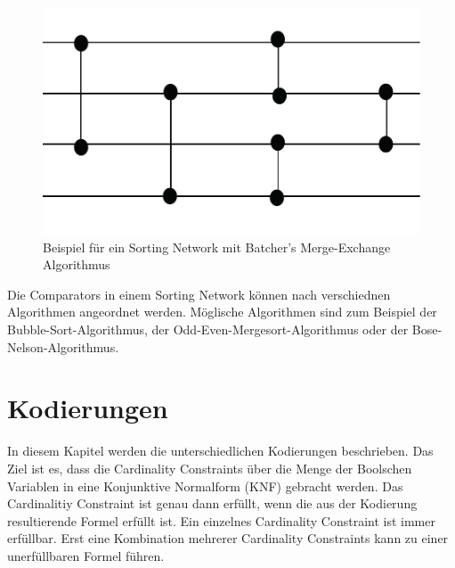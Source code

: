 \documentclass[a4,abstract=on]{scrartcl}
\newcommand*\stdsection{}
\let\stdsection\section
\renewcommand*\section{%
    \clearpage\ifodd\value{page}\else\mbox{}\clearpage\fi
    \stdsection}
\begin{document}
\begin{figure}[H]
\centering
\includegraphics[width=\textwidth]{sorting_network_grundlage1.pdf}
\caption{Beispiel für ein Sorting Network mit Batcher's Merge-Exchange Algorithmus}
\label{fig:network_grundlage}
\end{figure}

Die Comparators in einem Sorting Network können nach verschiednen Algorithmen angeordnet werden. Möglische Algorithmen sind zum Beispiel der Bubble-Sort-Algorithmus, der Odd-Even-Mergesort-Algorithmus oder der Bose-Nelson-Algorithmus.

\section{Kodierungen}
In diesem Kapitel werden die unterschiedlichen Kodierungen beschrieben. Das Ziel ist es, dass die Cardinality Constraints über die Menge der Boolschen Variablen in eine Konjunktive Normalform (KNF) gebracht werden. %
Das Cardinalitiy Constraint ist genau dann erfüllt, wenn die aus der Kodierung resultierende Formel erfüllt ist. Ein einzelnes Cardinality Constraint ist immer erfüllbar. Erst eine Kombination mehrerer Cardinality Constraints kann zu einer unerfüllbaren Formel führen.

\end{document}
